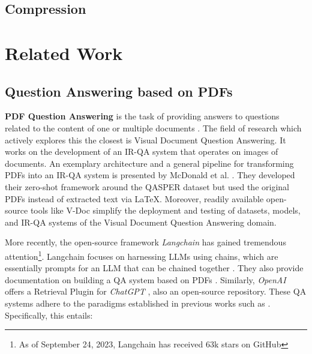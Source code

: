 \subsection{Compression}
\label{subsec:llm_compression}

\section{Related Work}
\label{sec:related_work}

\subsection{Question Answering based on PDFs}
\label{subsec:related_work_dbqa}

\textbf{PDF Question Answering} is the task of providing answers to questions related to the content of one or multiple documents \cite{mathew_document_2021}. The field of research which actively explores this the closest is Visual Document Question Answering. It works on the development of an IR-QA system that operates on images of documents. An exemplary architecture and a general pipeline for transforming PDFs into an IR-QA system is presented by McDonald et al. \cite{mcdonald_detect_2022}. They developed their zero-shot framework around the QASPER dataset but used the original PDFs instead of extracted text via LaTeX. Moreover, readily available open-source tools like V-Doc \cite{ding_v-doc_2022} simplify the deployment and testing of datasets, models, and IR-QA systems of the Visual Document Question Answering domain.

More recently, the open-source framework \textit{Langchain} has gained tremendous attention\footnote{As of September 24, 2023, Langchain has received 63k stars on GitHub}. Langchain focuses on harnessing LLMs using chains, which are essentially prompts for an LLM that can be chained together \cite{noauthor_langchain-ailangchain_nodate}. They also provide documentation on building a QA system based on PDFs \cite{noauthor_question_nodate}. Similarly, \textit{OpenAI} offers a Retrieval Plugin for \textit{ChatGPT} \cite{noauthor_chatgpt_2023}, also an open-source repository. These QA systems adhere to the paradigms established in previous works such as \cite{karpukhin_dense_2020,ni_large_2021,neelakantan_text_2022,lewis_retrieval-augmented_2021}. Specifically, this entails:

